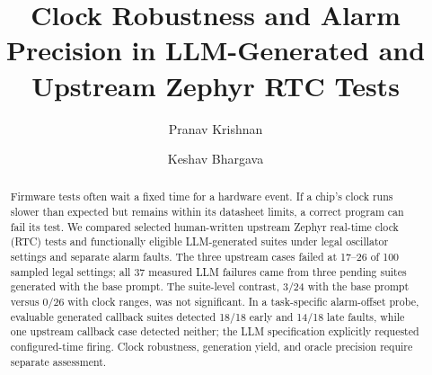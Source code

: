 \documentclass[sigconf,nonacm]{acmart}
\begin{document}
\makeatletter
{}
\makeatother


\title[Clock Robustness and Alarm Precision]{Clock Robustness and Alarm Precision in LLM-Generated and Upstream Zephyr RTC Tests}
\author{Pranav Krishnan}
\author{Keshav Bhargava}

\begin{abstract}
Firmware tests often wait a fixed time for a hardware event. If a chip's clock runs slower than expected but remains within its datasheet limits, a correct program can fail its test. We compared selected human-written upstream Zephyr real-time clock (RTC) tests and functionally eligible LLM-generated suites under legal oscillator settings and separate alarm faults. The three upstream cases failed at 17--26 of 100 sampled legal settings; all 37 measured LLM failures came from three pending suites generated with the base prompt. The suite-level contrast, 3/24 with the base prompt versus 0/26 with clock ranges, was not significant. In a task-specific alarm-offset probe, evaluable generated callback suites detected 18/18 early and 14/18 late faults, while one upstream callback case detected neither; the LLM specification explicitly requested configured-time firing. Clock robustness, generation yield, and oracle precision require separate assessment.
\end{abstract}
\maketitle
\end{document}
